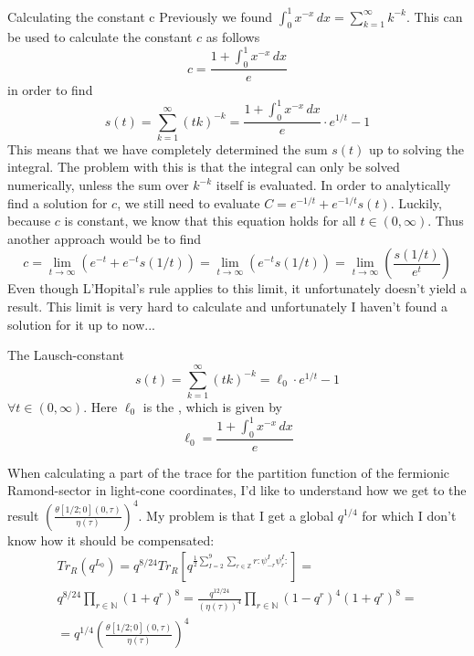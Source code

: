 \documentclass[11pt, xcolor=dvipsnames,aspectratio=169]{beamer}
\begin{document}
\begin{frame}{Calculating the constant c}
Previously we found $\int_0^1 x^{-x} \,dx = \sum_{k=1}^{\infty} k^{-k}$. This can be used to calculate the constant $c$ as follows
\begin{equation}
    c = \frac{1+\int_0^1 x^{-x} \,dx}{e}
\end{equation}
    in order to find
    \begin{equation}
        s(t) = \sum_{k=1}^{\infty} (tk)^{-k} = \frac{1+\int_0^1 x^{-x} \,dx}{e} \cdot e^{1/t} - 1
    \end{equation}
This means that we have completely determined the sum $s(t)$ up to solving the integral. The problem with this is that the integral can only be solved numerically, unless the sum over $k^{-k}$ itself is evaluated. In order to analytically find a solution for $c$, we still need to evaluate $C = e^{-1/t} + e^{-1/t} s(t)$. Luckily, because $c$ is constant, we know that this equation holds for all $t\in (0,\infty )$. Thus another approach would be to find
\begin{equation}
    c = \lim_{t\rightarrow \infty}\left( e^{-t} + e^{-t} s(1/t)\right) = \lim_{t\rightarrow \infty}\left( e^{-t} s(1/t)\right) =\lim_{t\rightarrow \infty}\left( \frac{s(1/t)}{e^t}\right)
\end{equation}
Even though L'Hopital's rule applies to this limit, it unfortunately doesn't yield a result. This limit is very hard to calculate and unfortunately I haven't found a solution for it up to now...    
\end{frame}
\begin{frame}{The Lausch-constant}
    \begin{equation}
       \boxed{ s(t) = \sum_{k=1}^{\infty} (tk)^{-k} = \ell_0 \cdot e^{1/t} - 1}
    \end{equation}
    $\forall t \in (0, \infty )$. Here $\ell_0$ is the , which is given by 
    \begin{equation}
        \boxed{\ell_0 = \frac{1+\int_0^1 x^{-x} \,dx}{e}}
    \end{equation}
\end{frame}
\begin{frame}
When calculating a part of the trace for the partition function of the fermionic Ramond-sector in light-cone coordinates, I'd like to understand how we get to the result \(\left(\frac{\theta \left[1/2;0\right](0,\tau)}{\eta (\tau)} \right)^4\). My problem is that I get a global \(q^{1/4}\) for which I don't know how it should be compensated:
\begin{eqnarray}
Tr_R(q^{L_0}) = q^{8/24} Tr_R\left[ q^{\frac{1}{2}\sum_{I=2}^9\sum_{r\in \mathbb{Z}}r:\psi_{-r}^I\psi_{r}^I:}\right] = \\
q^{8/24} \prod_{r\in \mathbb{N}} (1+q^r)^8 = \frac{q^{12/24}}{(\eta (\tau ))^4} \prod_{r\in \mathbb{N}} (1-q^r)^4 (1+q^r)^8 =\\
= q^{1/4} \left(\frac{\theta \left[1/2;0\right](0,\tau)}{\eta (\tau)} \right)^4
\end{eqnarray}
\end{frame}
\end{document}
